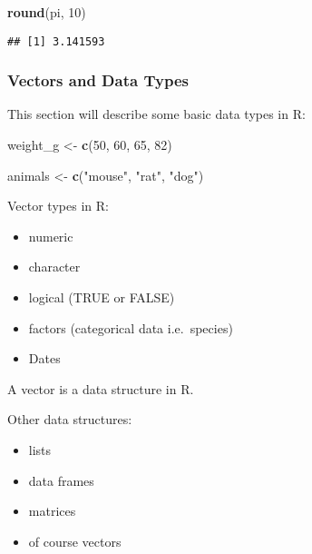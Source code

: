 \documentclass[]{article}
\newenvironment{Shaded}{\begin{snugshade}}{\end{snugshade}}
\newcommand{\KeywordTok}[1]{\textcolor[rgb]{0.13,0.29,0.53}{\textbf{#1}}}
\newcommand{\DecValTok}[1]{\textcolor[rgb]{0.00,0.00,0.81}{#1}}
\newcommand{\StringTok}[1]{\textcolor[rgb]{0.31,0.60,0.02}{#1}}
\newcommand{\NormalTok}[1]{#1}
\providecommand{\tightlist}{%
  \setlength{\itemsep}{0pt}\setlength{\parskip}{0pt}}
\begin{document}
\begin{Shaded}
\begin{Highlighting}[]
\KeywordTok{round}\NormalTok{(pi, }\DecValTok{10}\NormalTok{)}
\end{Highlighting}
\end{Shaded}

\begin{verbatim}
## [1] 3.141593
\end{verbatim}

\subsubsection{Vectors and Data Types}\label{vectors-and-data-types}

This section will describe some basic data types in R:

\begin{Shaded}
\begin{Highlighting}[]
\NormalTok{weight_g <-}\StringTok{ }\KeywordTok{c}\NormalTok{(}\DecValTok{50}\NormalTok{, }\DecValTok{60}\NormalTok{, }\DecValTok{65}\NormalTok{, }\DecValTok{82}\NormalTok{)}

\NormalTok{animals <-}\StringTok{ }\KeywordTok{c}\NormalTok{(}\StringTok{"mouse"}\NormalTok{, }\StringTok{"rat"}\NormalTok{, }\StringTok{"dog"}\NormalTok{)}
\end{Highlighting}
\end{Shaded}

Vector types in R:

\begin{itemize}
\tightlist
\item
  numeric
\item
  character
\item
  logical (TRUE or FALSE)
\item
  factors (categorical data i.e.~species)
\item
  Dates
\end{itemize}

A vector is a data structure in R.

Other data structures:

\begin{itemize}
\tightlist
\item
  lists
\item
  data frames
\item
  matrices
\item
  of course vectors
\end{itemize}
\end{document}
